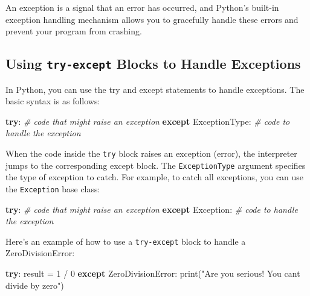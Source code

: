\documentclass[11pt]{article}
\newenvironment{Shaded}{}{}
\newcommand{\DecValTok}[1]{\textcolor[rgb]{0.25,0.63,0.44}{{#1}}}
\newcommand{\StringTok}[1]{\textcolor[rgb]{0.25,0.44,0.63}{{#1}}}
\newcommand{\CommentTok}[1]{\textcolor[rgb]{0.38,0.63,0.69}{\textit{{#1}}}}
\newcommand{\NormalTok}[1]{{#1}}
\newcommand{\ControlFlowTok}[1]{\textcolor[rgb]{0.00,0.44,0.13}{\textbf{{#1}}}}
\newcommand{\OperatorTok}[1]{\textcolor[rgb]{0.40,0.40,0.40}{{#1}}}
\newcommand{\BuiltInTok}[1]{{#1}}
\newcommand{\PreprocessorTok}[1]{\textcolor[rgb]{0.74,0.48,0.00}{{#1}}}
\begin{document}
An exception is a signal that an error has occurred, and Python's
built-in exception handling mechanism allows you to gracefully handle
these errors and prevent your program from crashing.

\hypertarget{using-try-except-blocks-to-handle-exceptions}{%
\subsection{\texorpdfstring{Using \texttt{try-except} Blocks to Handle
Exceptions}{Using try-except Blocks to Handle Exceptions}}\label{using-try-except-blocks-to-handle-exceptions}}

In Python, you can use the try and except statements to handle
exceptions. The basic syntax is as follows:

\begin{Shaded}
\begin{Highlighting}[]
\ControlFlowTok{try}\NormalTok{:}
    \CommentTok{\# code that might raise an exception}
\ControlFlowTok{except}\NormalTok{ ExceptionType:}
    \CommentTok{\# code to handle the exception}
\end{Highlighting}
\end{Shaded}

When the code inside the \texttt{try} block raises an exception (error),
the interpreter jumps to the corresponding except block. The
\texttt{ExceptionType} argument specifies the type of exception to
catch. For example, to catch all exceptions, you can use the
\texttt{Exception} base class:

\begin{Shaded}
\begin{Highlighting}[]
\ControlFlowTok{try}\NormalTok{:}
    \CommentTok{\# code that might raise an exception}
\ControlFlowTok{except} \PreprocessorTok{Exception}\NormalTok{:}
    \CommentTok{\# code to handle the exception}
\end{Highlighting}
\end{Shaded}

Here's an example of how to use a \texttt{try-except} block to handle a
ZeroDivisionError:

\begin{Shaded}
\begin{Highlighting}[]
\ControlFlowTok{try}\NormalTok{:}
\NormalTok{    result }\OperatorTok{=} \DecValTok{1} \OperatorTok{/} \DecValTok{0}
\ControlFlowTok{except} \PreprocessorTok{ZeroDivisionError}\NormalTok{:}
    \BuiltInTok{print}\NormalTok{(}\StringTok{"Are you serious! You can\textquotesingle{}t divide by zero"}\NormalTok{)}
\end{Highlighting}
\end{Shaded}
\end{document}
